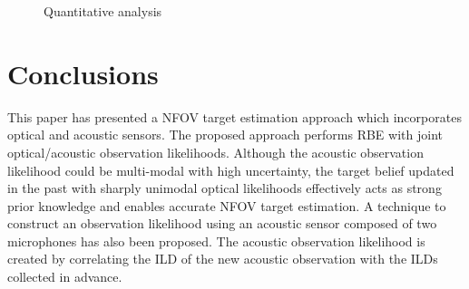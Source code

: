 \begin{figure}[ht]
	\centering
	\caption{Quantitative analysis}
	\label{fig:quantitative}
\end{figure}

\section{Conclusions}
\label{sec:conclusions}
This paper has presented a NFOV target estimation approach which incorporates optical and acoustic sensors.  The proposed approach performs RBE with joint optical/acoustic observation likelihoods.  Although the acoustic observation likelihood could be multi-modal with high uncertainty, the target belief updated in the past with sharply unimodal optical likelihoods effectively acts as strong prior knowledge and enables accurate NFOV target estimation.  A technique to construct an observation likelihood using an acoustic sensor composed of two microphones has also been proposed.  The acoustic observation likelihood is created by correlating the ILD of the new acoustic observation with the ILDs collected in advance.   

